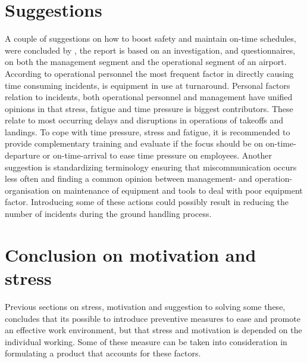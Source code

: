 \section{Suggestions}
    A couple of suggestions on how to boost safety and maintain on-time schedules, were concluded by \cite{Bossenbroek2010}, the report is based on an investigation, and questionnaires, on both the management segment and the operational segment of an airport. According to operational personnel the most frequent factor in directly causing time consuming incidents, is equipment in use at turnaround. 
    Personal factors relation to incidents, both operational personnel and management have unified opinions in that stress, fatigue and time pressure is biggest contributors. These relate to most occurring delays and disruptions in operations of takeoffs and landings. To cope with time pressure, stress and fatigue, it is recommended to provide complementary training and evaluate if the focus should be on on-time-departure or on-time-arrival to ease time pressure on employees. Another suggestion is standardizing terminology ensuring that miscommunication occurs less often and finding a common opinion between management- and operation-organisation on maintenance of equipment and tools to deal with poor equipment factor. Introducing some of these actions could possibly result in reducing the number of incidents during the ground handling process.

\section{Conclusion on motivation and stress}
    Previous sections on stress, motivation and suggestion to solving some these, concludes that its possible to introduce preventive measures to ease and promote an effective work environment, but that stress and motivation is depended on the individual working. Some of these measure can be taken into consideration in formulating a product that accounts for these factors.